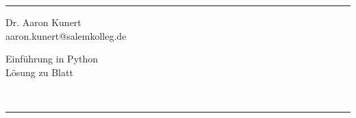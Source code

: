 \fancyhead[C]{}
\hrule \medskip %
\begin{minipage}[t]{0.295\textwidth}
\raggedright
\footnotesize
Dr. Aaron Kunert \hfill\\   
aaron.kunert@salemkolleg.de \hfill \\
\end{minipage}
\begin{minipage}[t]{0.4\textwidth} 
\centering 
\large 
Einführung in Python\\ 
\normalsize 
Lösung zu Blatt \thesheetnumber{}\\ 
\end{minipage}
\begin{minipage}[t]{0.295\textwidth} 
\raggedleft
\footnotesize
\thesheetdate{}
\hfill\\
\end{minipage}
\medskip\hrule 
\bigskip